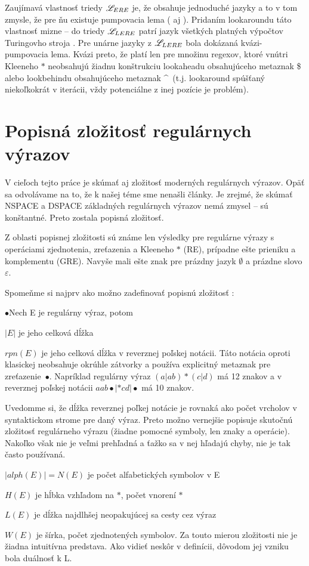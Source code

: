 Zaujímavá vlastnosť triedy $\mathscr{L}_{ERE}$ je, že obsahuje jednoduché jazyky a to v tom zmysle, že pre ňu existuje pumpovacia lema (\cite{ExtendedRegexPower} aj \cite{ExtendedRegexIntersec}). Pridaním look\-aroundu táto vlastnosť mizne -- do triedy $\mathscr{L}_{LERE}$ patrí jazyk všetkých platných výpočtov Turingovho stroja \cite[Veta 2.2.16.]{mojaBak}. Pre unárne jazyky z $\mathscr{L}_{LERE}$ bola dokázaná kvázi-pumpovacia lema. Kvázi preto, že platí len pre množinu regexov, ktoré vnútri Kleeneho $*$ neobsahujú žiadnu konštrukciu lookaheadu obsahujúceho metaznak \$ alebo lookbehindu obsahujúceho metaznak \textasciicircum ~(t.j. lookaround spúšťaný niekoľkokrát v iterácii, vždy potenciálne z inej pozície je problém).


\section[Popisná zložitosť]{Popisná zložitosť regulárnych výrazov}
\label{uzlozitost}

V cieľoch tejto práce je skúmať aj zložitosť moderných regulárnych výrazov. Opäť sa odvolávame na to, že k našej téme sme nenašli články. Je zrejmé, že skúmať NSPACE a DSPACE základných regulárnych výrazov nemá zmysel -- sú konštantné. Preto zostala popisná zložitosť.

Z oblasti popisnej zložitosti sú známe len výsledky pre regulárne výrazy s operáciami zjednotenia, zreťazenia a Kleeneho $*$ (RE), prípadne ešte prieniku a komplementu (GRE). Navyše mali ešte znak pre prázdny jazyk $\emptyset$ a prázdne slovo $\varepsilon$.

Spomeňme si najprv ako možno zadefinovať popisnú zložitosť \cite{newResults} \cite{compMeasures75}:

\begin{list}{$\bullet$}{Nech E je regulárny výraz, potom}
\item $|E|$ je jeho celková dĺžka
\item $rpn(E)$ je jeho celková dĺžka v reverznej poľskej notácii. Táto notácia oproti klasickej neobsahuje okrúhle zátvorky a používa explicitný metaznak pre zreťazenie~$\bullet$. Napríklad regulárny výraz $(a|ab)*(c|d)$ má 12 znakov a v reverznej poľskej notácii $aab\bullet |*cd|\bullet$ má 10 znakov.

Uvedomme si, že dĺžka reverznej poľkej notácie je rovnaká ako počet vrcholov v syntaktickom strome pre daný výraz. Preto možno vernejšie popisuje skutočnú zložitosť regulárneho výrazu (žiadne pomocné symboly, len znaky a operácie). Nakoľko však nie je veľmi prehľadná a ťažko sa v nej hľadajú chyby, nie je tak často používaná.
\item $|alph(E)|= N(E)$ je počet alfabetických symbolov v E
\item $H(E)$ je hĺbka vzhľadom na $*$, počet vnorení $*$
\item $L(E)$ je dĺžka najdlhšej neopakujúcej sa cesty cez výraz
\item $W(E)$ je šírka, počet zjednotených symbolov. Za touto mierou zložitosti nie je žiadna intuitívna predstava. Ako vidieť neskôr v definícii, dôvodom jej vzniku bola duálnosť k L.
\end{list}

